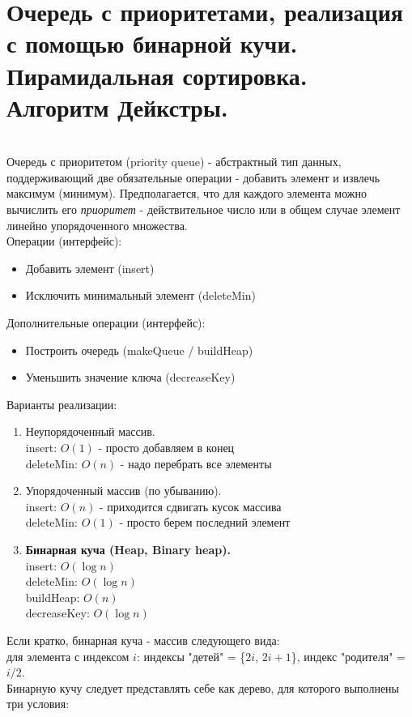 \section{Очередь с приоритетами, реализация с помощью бинарной кучи. Пирамидальная сортировка. Алгоритм Дейкстры.}
\\
Очередь с приоритетом (priority queue) - абстрактный тип данных, поддерживающий две обязательные операции - добавить элемент и извлечь максимум (минимум). Предполагается, что для каждого элемента можно вычислить его {\it приоритет} - действительное число или в общем случае элемент линейно упорядоченного множества.\\
Операции (интерфейс):
\begin{itemize}
\item Добавить элемент (insert)
\item Исключить минимальный элемент (deleteMin)
\end{itemize}
Дополнительные операции (интерфейс):
\begin{itemize}
\item Построить очередь (makeQueue / buildHeap)
\item Уменьшить значение ключа (decreaseKey)
\end{itemize}
Варианты реализации:
\begin{enumerate}
\item Неупорядоченный массив.\\
insert: $O(1)$ - просто добавляем в конец\\
deleteMin: $O(n)$ - надо перебрать все элементы
\item Упорядоченный массив (по убыванию).\\
insert: $O(n)$ - приходится сдвигать кусок массива\\
deleteMin: $O(1)$ - просто берем последний элемент
\item {\bf Бинарная куча (Heap, Binary heap).}\\
insert: $O(\log n)$\\
deleteMin: $O(\log n)$\\
buildHeap: $O(n)$\\
decreaseKey: $O(\log n)$
\end{enumerate}
Если кратко, бинарная куча - массив следующего вида:\\
для элемента с индексом $i$: индексы "детей"{} = \{$2i$, $2i + 1$\}, индекс "родителя"{} = $i/2$.\\
Бинарную кучу следует представлять себе как дерево, для которого выполнены три условия:
